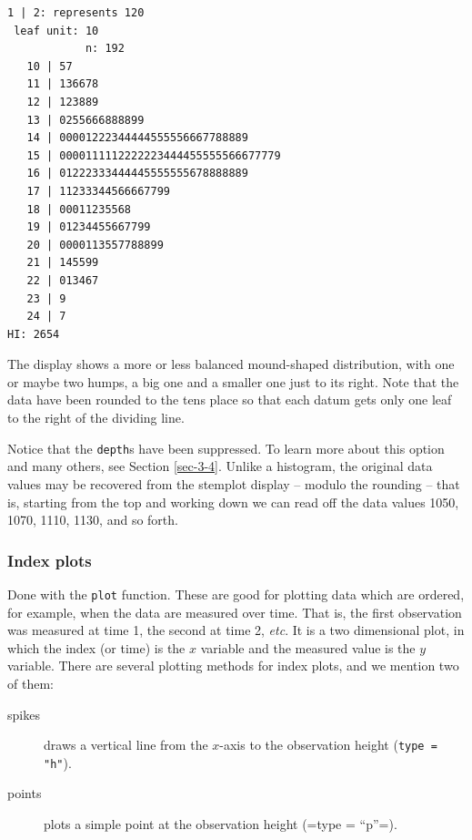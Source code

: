 \documentclass[captions=tableheading]{scrbook}
\begin{document}
\begin{verbatim}
1 | 2: represents 120
 leaf unit: 10
            n: 192
   10 | 57
   11 | 136678
   12 | 123889
   13 | 0255666888899
   14 | 00001222344444555556667788889
   15 | 0000111112222223444455555566677779
   16 | 01222333444445555555678888889
   17 | 11233344566667799
   18 | 00011235568
   19 | 01234455667799
   20 | 0000113557788899
   21 | 145599
   22 | 013467
   23 | 9
   24 | 7
HI: 2654
\end{verbatim}

The display shows a more or less balanced mound-shaped distribution, with one or maybe two humps, a big one and a smaller one just to its right. Note that the data have been rounded to the tens place so that each datum gets only one leaf to the right of the dividing line.

Notice that the \texttt{depth}s have been suppressed. To learn more about this option and many others, see Section \ref{sec-3-4}. Unlike a histogram, the original data values may be recovered from the stemplot display -- modulo the rounding -- that is, starting from the top and working down we can read off the data values 1050, 1070, 1110, 1130, and so forth. 
\subsubsection{Index plots}
\label{sec-3-1-2-4}


Done with the \texttt{plot} function. These are good for plotting data which are ordered, for example, when the data are measured over time. That is, the first observation was measured at time 1, the second at time 2, \emph{etc}. It is a two dimensional plot, in which the index (or time) is the \(x\) variable and the measured value is the \(y\) variable. There are several plotting methods for index plots, and we mention two of them:

\begin{description}
\item[spikes] draws a vertical line from the \(x\)-axis to the observation height (\texttt{type = "h"}).
\item[points] plots a simple point at the observation height (=type = ``p''=).
\end{description}
\end{document}
